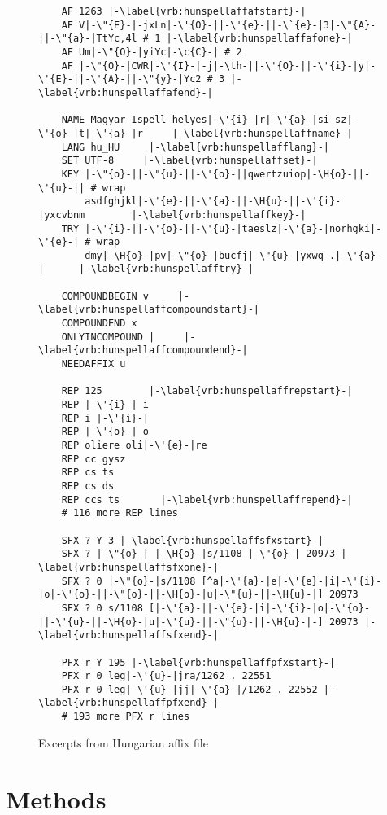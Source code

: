 \documentclass[a4paper,runningheads]{llncs}
\begin{document}
\begin{figure}[tbp]
  \centering
  \begin{lstlisting}
    AF 1263 |-\label{vrb:hunspellaffafstart}-|
    AF V|-\"{E}-|-jxLn|-\'{O}-||-\'{e}-||-\`{e}-|3|-\"{A}-||-\"{a}-|TtYc,4l # 1 |-\label{vrb:hunspellaffafone}-|
    AF Um|-\"{O}-|yiYc|-\c{C}-| # 2
    AF |-\"{O}-|CWR|-\'{I}-|-j|-\th-||-\'{O}-||-\'{i}-|y|-\'{E}-||-\'{A}-||-\"{y}-|Yc2 # 3 |-\label{vrb:hunspellaffafend}-|

    NAME Magyar Ispell helyes|-\'{i}-|r|-\'{a}-|si sz|-\'{o}-|t|-\'{a}-|r     |-\label{vrb:hunspellaffname}-|
    LANG hu_HU     |-\label{vrb:hunspellafflang}-|
    SET UTF-8     |-\label{vrb:hunspellaffset}-|
    KEY |-\"{o}-||-\"{u}-||-\'{o}-||qwertzuiop|-\H{o}-||-\'{u}-|| # wrap
        asdfghjkl|-\'{e}-||-\'{a}-||-\H{u}-||-\'{i}-|yxcvbnm        |-\label{vrb:hunspellaffkey}-|
    TRY |-\'{i}-||-\'{o}-||-\'{u}-|taeslz|-\'{a}-|norhgki|-\'{e}-| # wrap
        dmy|-\H{o}-|pv|-\"{o}-|bucfj|-\"{u}-|yxwq-.|-\'{a}-|      |-\label{vrb:hunspellafftry}-|
    
    COMPOUNDBEGIN v     |-\label{vrb:hunspellaffcompoundstart}-|
    COMPOUNDEND x     
    ONLYINCOMPOUND |     |-\label{vrb:hunspellaffcompoundend}-|
    NEEDAFFIX u     
    
    REP 125        |-\label{vrb:hunspellaffrepstart}-|
    REP |-\'{i}-| i       
    REP i |-\'{i}-|       
    REP |-\'{o}-| o       
    REP oliere oli|-\'{e}-|re
    REP cc gysz       
    REP cs ts       
    REP cs ds       
    REP ccs ts       |-\label{vrb:hunspellaffrepend}-|
    # 116 more REP lines
    
    SFX ? Y 3 |-\label{vrb:hunspellaffsfxstart}-|
    SFX ? |-\"{o}-| |-\H{o}-|s/1108 |-\"{o}-| 20973 |-\label{vrb:hunspellaffsfxone}-|
    SFX ? 0 |-\"{o}-|s/1108 [^a|-\'{a}-|e|-\'{e}-|i|-\'{i}-|o|-\'{o}-||-\"{o}-||-\H{o}-|u|-\"{u}-||-\H{u}-|] 20973
    SFX ? 0 s/1108 [|-\'{a}-||-\'{e}-|i|-\'{i}-|o|-\'{o}-||-\'{u}-||-\H{o}-|u|-\'{u}-||-\"{u}-||-\H{u}-|-] 20973 |-\label{vrb:hunspellaffsfxend}-|
    
    PFX r Y 195 |-\label{vrb:hunspellaffpfxstart}-|
    PFX r 0 leg|-\'{u}-|jra/1262 . 22551
    PFX r 0 leg|-\'{u}-|jj|-\'{a}-|/1262 . 22552 |-\label{vrb:hunspellaffpfxend}-|
    # 193 more PFX r lines
  \end{lstlisting}
  \caption{Excerpts from Hungarian affix file}
  \label{fig:hunspell-aff-examples}
\end{figure}

\section{Methods}
\label{sec:methods}
\end{document}
